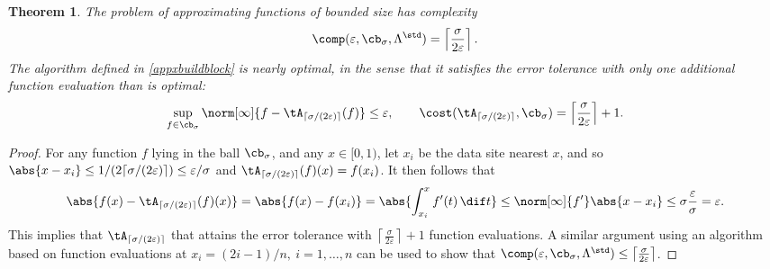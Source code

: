 \documentclass[12pt]{amsart}
\newtheorem{theorem}{Theorem}
\begin{document}
\begin{theorem} \label{stdappxthm}  The problem of approximating functions of bounded size has complexity
\[
\comp(\varepsilon,\cb_{\sigma},\Lambda^{\std}) = \left \lceil \frac{\sigma}{2\varepsilon} \right \rceil.
\]
The algorithm defined in \eqref{appxbuildblock} is nearly optimal, in the sense that it satisfies the error tolerance with only one additional function evaluation than is optimal:
\[
\sup_{f \in \cb_{\sigma}} \norm[\infty]{f - \tA_{\lceil\sigma/(2\varepsilon)\rceil}(f)} \le \varepsilon, \qquad \cost(\tA_{\lceil\sigma/(2\varepsilon)\rceil},\cb_{\sigma}) = \left \lceil \frac{\sigma}{2\varepsilon} \right \rceil + 1.
\]
\end{theorem}
\begin{proof}  For any function $f$ lying in the ball $\cb_\sigma$, and any $x \in [0,1)$, let $x_i$ be the data site nearest $x$, and so $\abs{x-x_i} \le 1/(2\lceil\sigma/(2\varepsilon)\rceil) \le \varepsilon/\sigma$ and $\tA_{\lceil\sigma/(2\varepsilon)\rceil}(f)(x)=f(x_i)$. It then follows that
\begin{equation*}
\abs{f(x) - \tA_{\lceil\sigma/(2\varepsilon)\rceil}(f)(x)}=\abs{f(x) - f(x_i)} = \abs{\int_{x_i}^x f'(t) \, \dif t} \le \norm[\infty]{f'} \abs{x-x_i} \le  \sigma \frac{\varepsilon}{\sigma} = \varepsilon.
\end{equation*}
This implies that $\tA_{\lceil\sigma/(2\varepsilon)\rceil}$ that attains the error tolerance with  $\left \lceil \frac{\sigma}{2\varepsilon} \right \rceil + 1$ function evaluations.  A similar argument using an algorithm based on function evaluations at $x_i=(2i-1)/n,\ i=1, \ldots, n$ can be used to show that $\comp(\varepsilon,\cb_{\sigma},\Lambda^{\std}) \le \left \lceil \frac{\sigma}{2\varepsilon} \right \rceil$.


\end{proof}
\end{document}
